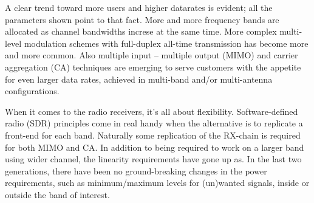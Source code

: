 \documentclass[a4paper, 12pt]{article}
\begin{document}
A clear trend toward more users and higher datarates is evident; all the 
parameters shown point to that fact. More and more frequency bands are 
allocated as channel bandwidths increse at the same time. More complex 
multi-level modulation schemes with full-duplex all-time transmission has 
become more and more common. Also multiple input -- multiple output (MIMO) 
and carrier aggregation (CA) techniques are emerging to serve customers 
with the appetite for even larger data rates, achieved in multi-band 
and/or multi-antenna configurations.

When it comes to the radio receivers, it's all about flexibility. 
Software-defined radio (SDR) principles come in real handy when the alternative 
is to replicate a front-end for each band. Naturally some replication of the 
RX-chain is required for both MIMO and CA. In addition to being required 
to work on a larger band using wider channel, the linearity requirements 
have gone up as. In the last two generations, there have been no ground-breaking 
changes in the power requirements, such as minimum/maximum levels for 
(un)wanted signals, inside or outside the band of interest.
\end{document}
